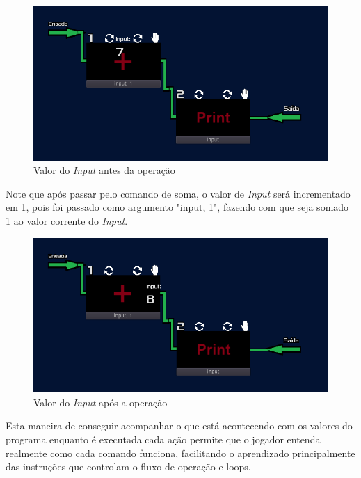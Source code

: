 \begin{figure}[H]
    \includegraphics[width=\textwidth]{../figuras/antes_da_soma.png}
    \caption{Valor do \textit{Input} antes da opera\c{c}\~{a}o}
\end{figure}

Note que após passar pelo comando de soma, o valor de \textit{Input} será 
incrementado em 1, pois foi passado como argumento "input, 1", fazendo com que 
seja somado 1 ao valor corrente do \textit{Input}.

\begin{figure}[H]
    \includegraphics[width=\textwidth]{../figuras/depois_da_soma.png}
    \caption{Valor do \textit{Input} após a opera\c{c}\~{a}o}
\end{figure}

Esta maneira de conseguir acompanhar o que está acontecendo com os valores do 
programa enquanto é executada cada ação permite que o jogador entenda realmente
como cada comando funciona, facilitando o aprendizado principalmente das 
instruções que controlam o fluxo de operação e loops.
